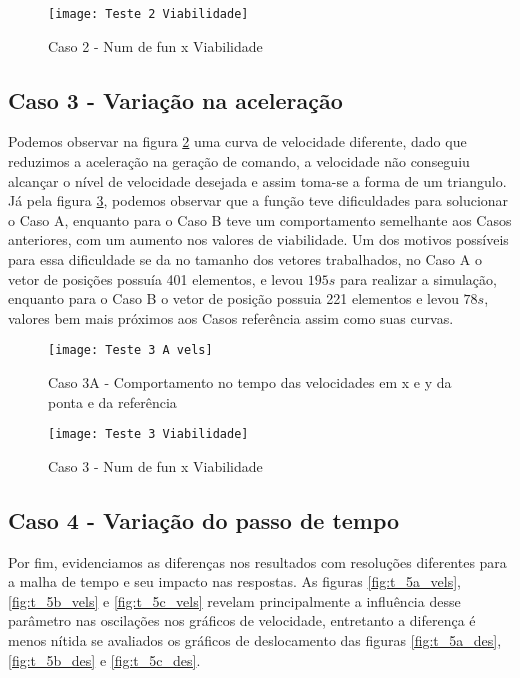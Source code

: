 \begin{figure}[H]
    \begin{center}
    \caption{Caso 2 - Num de fun x Viabilidade}
    \texttt{[image: Teste 2 Viabilidade]}
    \label{fig:t_2_viab}
    \end{center}
\end{figure}

\subsection{Caso 3 - Variação na aceleração}
Podemos observar na figura \ref{fig:t_3a_vels} uma curva de velocidade diferente, dado que reduzimos a aceleração
na geração de comando, a velocidade não conseguiu alcançar o nível de velocidade desejada e assim toma-se a forma de um triangulo.
Já pela figura \ref{fig:t_3_viab}, podemos observar que a função teve dificuldades para solucionar o Caso A, enquanto para o Caso B
teve um comportamento semelhante aos Casos anteriores, com um aumento nos valores de viabilidade.
Um dos motivos possíveis para essa dificuldade se da no tamanho dos vetores trabalhados, no Caso A o vetor de posições
possuía 401 elementos, e levou $195 s$ para realizar a simulação, enquanto para o Caso B o vetor de posição possuia 221 elementos
e levou $78 s$, valores bem mais próximos aos Casos referência assim como suas curvas.

\begin{figure}[H]
    \begin{center}
    \caption{Caso 3A - Comportamento no tempo das velocidades em x e y da ponta e da referência}
    \texttt{[image: Teste 3 A vels]}
    \label{fig:t_3a_vels}
    \end{center}
\end{figure}

\begin{figure}[H]
    \begin{center}
    \caption{Caso 3 - Num de fun x Viabilidade}
    \texttt{[image: Teste 3 Viabilidade]}
    \label{fig:t_3_viab}
    \end{center}
\end{figure}

\subsection{Caso 4 - Variação do passo de tempo}
Por fim, evidenciamos as diferenças nos resultados com resoluções diferentes para a malha de tempo e seu impacto nas respostas.
As figuras \ref{fig:t_5a_vels}, \ref{fig:t_5b_vels} e \ref{fig:t_5c_vels} revelam principalmente a influência desse parâmetro
nas oscilações nos gráficos de velocidade, entretanto a diferença é menos nítida se avaliados os gráficos de deslocamento das figuras
\ref{fig:t_5a_des}, \ref{fig:t_5b_des} e \ref{fig:t_5c_des}.

